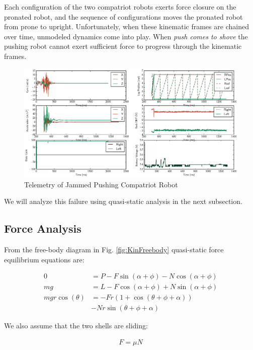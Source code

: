 \documentclass[letterpaper, 10 pt, conference]{ieeeconf}
\begin{document}
Each configuration of the two compatriot robots exerts force closure on the pronated robot, and the sequence of configurations moves the pronated robot from prone to upright.
Unfortunately, when these kinematic frames are chained over time, unmodeled dynamics come into play.
When \textit{push comes to shove} the pushing robot cannot exert sufficient force to progress through the kinematic frames.

\begin{figure}[ht]
  \centering
  \includegraphics[width=\columnwidth]{JammedTelemetry.eps}
  \caption{\label{fig:JammedKinFlipTelemetry}Telemetry of Jammed Pushing Compatriot Robot}
\end{figure}

We will analyze this failure using quasi-static analysis in the next subsection.

\subsection{Force Analysis \label{sec:KinForces}}
From the free-body diagram in Fig. \ref{fig:KinFreebody} quasi-static force equilibrium equations are:

\begin{align}
   0 &= P - F \sin(\alpha + \phi) - N \cos(\alpha + \phi) \label{eq:KinQSX} \\
  mg &= L - F \cos(\alpha + \phi) + N \sin(\alpha + \phi) \label{eq:KinQSY} \\
  mg r \cos(\theta) &= -F r (1 + \cos(\theta + \phi + \alpha) ) \\
  &  - N r \sin(\theta + \phi + \alpha) \label{eq:KinTorque}
\end{align}

We also assume that the two shells are sliding:

\begin{align}
  F = \mu N
  \label{eq:KinFriction}
\end{align}
\end{document}
